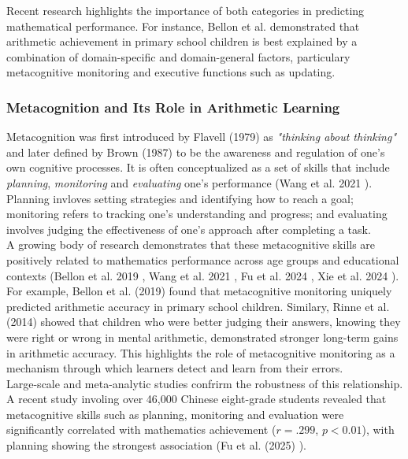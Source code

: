 Recent research highlights the importance of both categories in predicting mathematical performance.
For instance, Bellon et al. \cite{bellon_more_2019} demonstrated that arithmetic achievement in primary school children is best explained by a combination of domain-specific and domain-general factors, particulary metacognitive monitoring and executive functions such as updating. 

\subsubsection{Metacognition and Its Role in Arithmetic Learning}
Metacognition was first introduced by Flavell (1979) \cite{flavell_metacognition_1979} as \textit{"thinking about thinking"} and later defined by Brown (1987) \cite{brown_metacognition_1987} to be the awareness and regulation of one's own cognitive processes.
It is often conceptualized as a set of skills that include \textit{planning}, \textit{monitoring} and \textit{evaluating} one's performance (Wang et al. 2021 \cite{wang_skill_2021}).
Planning invloves setting strategies and identifying how to reach a goal; monitoring refers to tracking one's understanding and progress; and evaluating involves judging the effectiveness of one's approach after completing a task.\\
A growing body of research demonstrates that these metacognitive skills are positively related to mathematics performance across age groups and educational contexts (Bellon et al. 2019 \cite{bellon_more_2019}, Wang et al. 2021 \cite{wang_skill_2021}, Fu et al. 2024 \cite{fu_relationship_2025}, Xie et al. 2024 \cite{xie_meta_2024}).
For example, Bellon et al. (2019) \cite{bellon_more_2019} found that metacognitive monitoring uniquely predicted arithmetic accuracy in primary school children.
Similary, Rinne et al. (2014) \cite{rinne_knowing_2014} showed that children who were better judging their answers, knowing they were right or wrong in mental arithmetic, demonstrated stronger long-term gains in arithmetic accuracy.
This highlights the role of metacognitive monitoring as a mechanism through which learners detect and learn from their errors.\\
Large-scale and meta-analytic studies confrirm the robustness of this relationship.
A recent study involing over 46,000 Chinese eight-grade students revealed that metacognitive skills such as planning, monitoring and evaluation were significantly correlated with mathematics achievement ($r = .299$, $p < 0.01$), with planning showing the strongest association (Fu et al. (2025) \cite{fu_relationship_2025}).
